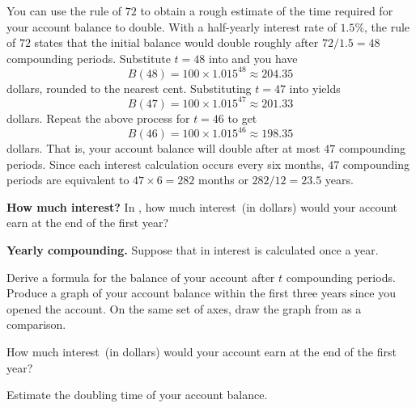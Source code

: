 \documentclass[a4paper,oneside,12pt]{article}
\begin{document}
\begin{solution}
You can use the rule of $72$ to obtain a rough estimate of the time
required for your account balance to double.  With a half-yearly
interest rate of $1.5\%$, the rule of $72$ states that the initial
balance would double roughly after $72 / 1.5 = 48$ compounding
periods.  Substitute $t = 48$ into
 and you have
\[
B(48)
=
100 \times 1.015^{48}
\approx
204.35
\]
dollars, rounded to the nearest cent.  Substituting $t = 47$ into
 yields
\[
B(47)
=
100 \times 1.015^{47}
\approx
201.33
\]
dollars.  Repeat the above process for $t = 46$ to get
\[
B(46)
=
100 \times 1.015^{46}
\approx
198.35
\]
dollars.  That is, your account balance will double after at most
$47$ compounding periods.  Since each interest calculation occurs
every six months, $47$ compounding periods are equivalent to
$47 \times 6 = 282$ months or $282 / 12 = 23.5$ years.
\end{solution}

\begin{exercise}
\textbf{How much interest?}
In , how much interest~(in
dollars) would your account earn at the end of the first year?
\end{exercise}


\begin{exercise}
\label{ex:exponential:savings_once_annually}
\textbf{Yearly compounding.}
Suppose that in  interest is
calculated once a year.
\begin{packedenum}
\item\label{subex:exponential:savings_1year_formula}
  Derive a formula for the balance of your account after $t$
  compounding periods.  Produce a graph of your account balance within
  the first three years since you opened the account.  On the same set
  of axes, draw the graph from
  as a comparison.

\item\label{subex:exponential:savings_1year_interest}
  How much interest~(in dollars) would your account earn at the end of
  the first year?

\item\label{subex:exponential:savings_1year_doubling_time}
  Estimate the doubling time of your account balance.
\end{packedenum}
\end{exercise}
\end{document}
